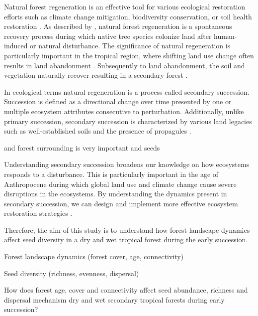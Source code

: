 Natural forest regeneration is an effective tool for various ecological restoration efforts such as climate change mitigation, biodiversity conservation, or soil health restoration \citep{hordijkLandUseHistory2024}. %
As described by \citet{crouzeillesEcologicalRestorationSuccess2017}, natural forest regeneration is a spontaneous recovery process during which native tree species colonize land after human-induced or natural disturbance.
The significance of natural regeneration is particularly important in the tropical region, where shifting land use change often results in land abandonment \citep{chazdonSecondGrowthPromise2014}. %
Subsequently to land abandonment, the soil and vegetation naturally recover resulting in a secondary forest \citep{hordijkLandUseHistory2024}. %

In ecological terms natural regeneration is a process called secondary succession. Succession is defined as a directional change over time presented by one or multiple ecosystem attributes consecutive to perturbation. Additionally, unlike primary succession, secondary succession is characterized by various land legacies such as well-established soils and the presence of propagules \citep{poorterSuccessionalTheories2023}. %


and forest surrounding is very important and seeds

Understanding secondary succession broadens our knowledge on how ecosystems responds to a disturbance. This is particularly important in the age of Anthropocene during which global land use and climate change cause severe disruptions in the ecosystems. By understanding the dynamics present in secondary succession, we can design and implement more effective ecosystem restoration strategies \cite{poorterSuccessionalTheories2023}.

Therefore, the aim of this study is to understand how forest landscape dynamics affect seed diversity in a dry and wet tropical forest during the early succession. 

Forest landscape dynamics (forest cover, age, connectivity)

Seed diversity (richness, evenness, dispersal)



How does forest age, cover and connectivity affect seed abundance, richness and dispersal mechanism dry and wet secondary tropical forests during early succession?